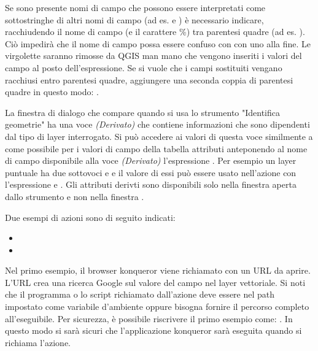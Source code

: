 Se sono presente nomi di campo che possono essere interpretati come
sottostringhe di altri nomi di campo (ad es.  e
) è necessario indicare, racchiudendo il nome di campo (e il
carattere \%) tra parentesi quadre (ad es. \usertext{[\%col10]}). Ciò impedirà
che il nome di campo  possa essere confuso con
 con uno  alla fine. Le virgolette saranno
rimosse da QGIS man mano che vengono inseriti i valori del campo al posto
dell'espressione. Se si vuole che i campi sostituiti vengano racchiusi entro
parentesi quadre, aggiungere una seconda coppia di parentesi quadre in questo
modo: \usertext{[[\%col10]]}.

La finestra di dialogo  che compare quando si
usa lo strumento "Identifica geometrie" ha una voce {\em (Derivato)} che
contiene informazioni che sono dipendenti dal tipo di layer interrogato. Si
può accedere ai valori di questa voce similmente a come possibile per i valori
di campo della tabella attributi anteponendo al nome di campo disponibile alla
voce {\em (Derivato)} l'espressione . Per esempio un
layer puntuale ha due sottovoci  e  e il valore di
essi può essere usato nell'azione con l'espressione 
e . Gli attributi derivti sono disponibili solo nella
finestra   aperta dallo strumento  e non nella finestra .

Due esempi di azioni sono di seguito indicati:

\begin{itemize}
  \item {}
  \item {}
\end{itemize}

Nel primo esempio, il browser konqueror viene richiamato con un URL da
aprire. L'URL crea una ricerca Google sul valore del campo  nel
layer vettoriale. Si noti che il programma o lo script richiamato dall'azione
deve essere nel path impostato come variabile d'ambiente oppure bisogna
fornire il percorso completo all'eseguibile. Per sicurezza, è possibile
riscrivere il primo esempio come: . In questo modo si sarà sicuri che
l'applicazione konqueror sarà eseguita quando si richiama l'azione.


